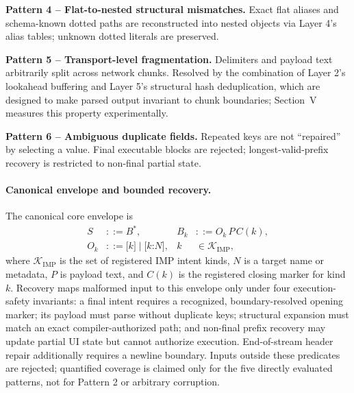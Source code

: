 \documentclass[conference]{IEEEtran}
\begin{document}
\textbf{Pattern 4 -- Flat-to-nested structural mismatches.} Exact flat
aliases and schema-known dotted paths are reconstructed into nested objects
via Layer 4's alias tables; unknown dotted literals are preserved.

\textbf{Pattern 5 -- Transport-level fragmentation.} Delimiters and
payload text arbitrarily split across network chunks. Resolved by the
combination of Layer 2's lookahead buffering and Layer 5's structural
hash deduplication, which are designed to make parsed output invariant to
chunk boundaries; Section~V measures this property experimentally.

\textbf{Pattern 6 -- Ambiguous duplicate fields.} Repeated keys are not
``repaired'' by selecting a value. Final executable blocks are rejected;
longest-valid-prefix recovery is restricted to non-final partial state.

\paragraph{Canonical envelope and bounded recovery.} The canonical core
envelope is
\[
\begin{aligned}
S &::= B^*, & B_k &::= O_k\,P\,C(k),\\
O_k &::= \texttt{[}k\texttt{]} \mid \texttt{[}k\texttt{:}N\texttt{]},
& k &\in \mathcal{K}_{\mathrm{IMP}},
\end{aligned}
\]
where $\mathcal{K}_{\mathrm{IMP}}$ is the set of registered IMP intent kinds,
$N$ is a target name or metadata, $P$ is payload text, and $C(k)$ is the
registered closing marker for kind $k$. Recovery maps malformed
input to this envelope only under four execution-safety invariants: a final
intent requires a recognized, boundary-resolved opening marker; its payload
must parse without duplicate keys; structural expansion must match an exact
compiler-authorized path; and non-final prefix recovery may update partial UI
state but cannot authorize execution. End-of-stream header repair additionally
requires a newline boundary. Inputs outside these predicates are rejected;
quantified coverage is claimed only for the five directly evaluated patterns,
not for Pattern 2 or arbitrary corruption.
\end{document}

